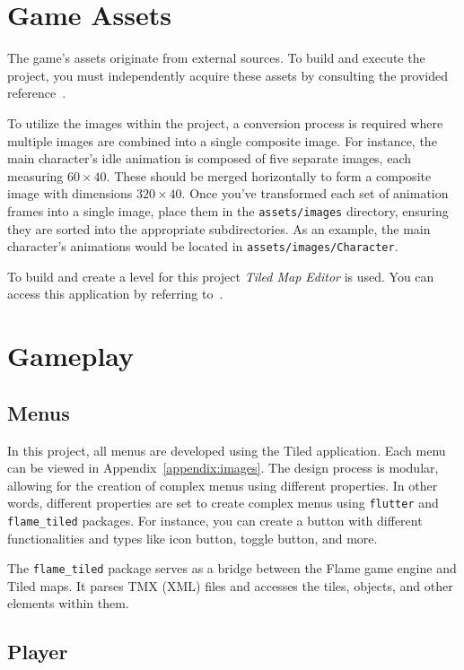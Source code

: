 \documentclass[12pt,a4paper,hidelinks]{report}
\begin{document}
\chapter{Game Assets}

The game's assets originate from external sources. To build and execute the project, you must independently acquire these assets by consulting the provided reference~\cite{assets}.

To utilize the images within the project, a conversion process is required where multiple images are combined into a single composite image. For instance, the main character's idle animation is composed of five separate images, each measuring $60\times40$. These should be merged horizontally to form a composite image with dimensions $320\times40$. Once you've transformed each set of animation frames into a single image, place them in the \verb|assets/images| directory, ensuring they are sorted into the appropriate subdirectories. As an example, the main character's animations would be located in \verb|assets/images/Character|.

To build and create a level for this project \textit{Tiled Map Editor} is used. You can access this application by referring to~\cite{tiled}.

\chapter{Gameplay}

\section{Menus}

In this project, all menus are developed using the Tiled application. Each menu can be viewed in Appendix~\ref{appendix:images}.
The design process is modular, allowing for the creation of complex menus using different properties. In other words, different properties are set to create complex menus using \verb|flutter| and \verb|flame_tiled| packages. For instance, you can create a button with different functionalities and types like icon button, toggle button, and more.
\par
The \verb|flame_tiled| package serves as a bridge between the Flame game engine and Tiled maps. It parses TMX (XML) files and accesses the tiles, objects, and other elements within them.

\section{Player}
\end{document}

